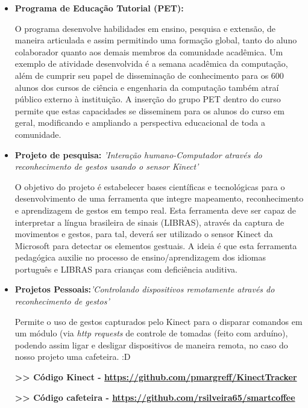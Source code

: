 \documentclass[11pt,a4paper,sans]{moderncv}        %
\begin{document}
\begin{itemize}

\item{\textbf{Programa de Educação Tutorial (PET):} \textit{}

\vspace{3pt}

\small{O programa desenvolve habilidades em ensino, pesquisa e extensão, de maneira articulada e assim permitindo uma formação global, tanto do aluno colaborador quanto aos demais membros da comunidade acadêmica. Um exemplo de atividade desenvolvida é a semana acadêmica da computação, além de cumprir seu papel de disseminação de conhecimento para os 600 alunos dos cursos de ciência e engenharia da computação também atraí público externo à instituição. A inserção do grupo PET dentro do curso permite que estas capacidades se disseminem para os alunos do curso em geral, modificando e ampliando a perspectiva educacional de toda a comunidade.}}

\item{\textbf{Projeto de pesquisa: } \textit{'Interação humano-Computador através do reconhecimento de gestos usando o sensor Kinect'}

\vspace{3pt}

\small{O objetivo do projeto é estabelecer bases científicas e tecnológicas para o desenvolvimento de uma ferramenta que integre mapeamento, reconhecimento e aprendizagem de gestos em tempo real. Esta ferramenta deve ser capaz de interpretar a língua brasileira de sinais (LIBRAS), através da captura de movimentos e gestos, para tal, deverá ser utilizado o sensor Kinect da Microsoft para detectar os elementos gestuais. A ideia é que esta ferramenta pedagógica auxilie no processo de ensino/aprendizagem dos idiomas português e LIBRAS para crianças com deficiência auditiva.}}

\vspace{6pt}

\item{\textbf{Projetos Pessoais:}\textit{'Controlando dispositivos remotamente através do reconhecimento de gestos'}

\vspace{3pt}

\small{Permite o uso de gestos  capturados pelo Kinect para o disparar comandos em um módulo (via \textit{http requests} de controle de tomadas (feito com arduíno), podendo assim ligar e desligar dispositivos de maneira remota, no caso do nosso projeto uma cafeteira. :D

\textbf{>> Código Kinect - \href{https://github.com/pmargreff/KinectTracker}{https://github.com/pmargreff/KinectTracker}}

\textbf{>> Código cafeteira - \href{https://github.com/rsilveira65/smartcoffee}{https://github.com/rsilveira65/smartcoffee}}}
}

\end{itemize}
\end{document}
